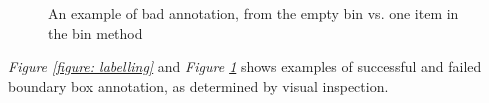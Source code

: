 \begin{figure}[h]
 \centering
 \hspace{0.5cm}
 \hspace{0.5cm}
 \hspace{0.5cm}
 \caption{An example of bad annotation, from the empty bin vs. one item in the bin method}
 \label{figure: badlabelling}
\end{figure}
\textit{Figure \ref{figure: labelling}} and \textit{Figure \ref{figure: badlabelling}} shows examples of successful and failed boundary box annotation, as determined by visual inspection. 


